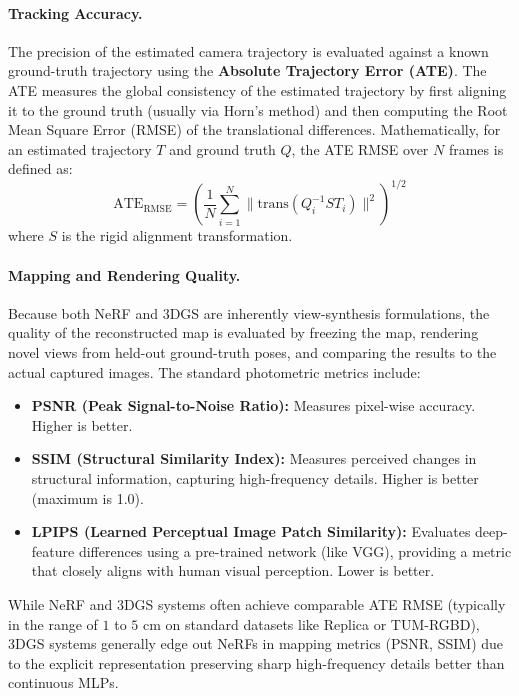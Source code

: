 \paragraph{Tracking Accuracy.} 
The precision of the estimated camera trajectory is evaluated against a known ground-truth trajectory using the \textbf{Absolute Trajectory Error (ATE)}. The ATE measures the global consistency of the estimated trajectory by first aligning it to the ground truth (usually via Horn's method) and then computing the Root Mean Square Error (RMSE) of the translational differences. Mathematically, for an estimated trajectory $T$ and ground truth $Q$, the ATE RMSE over $N$ frames is defined as:
\begin{equation}
    \text{ATE}_{\text{RMSE}} = \left( \frac{1}{N} \sum_{i=1}^{N} \bigl\| \text{trans}(Q_i^{-1} S T_i) \bigr\|^2 \right)^{1/2}
\end{equation}
where $S$ is the rigid alignment transformation.

\paragraph{Mapping and Rendering Quality.} 
Because both NeRF and 3DGS are inherently view-synthesis formulations, the quality of the reconstructed map is evaluated by freezing the map, rendering novel views from held-out ground-truth poses, and comparing the results to the actual captured images. The standard photometric metrics include:
\begin{itemize}
    \item \textbf{PSNR (Peak Signal-to-Noise Ratio):} Measures pixel-wise accuracy. Higher is better.
    \item \textbf{SSIM (Structural Similarity Index):} Measures perceived changes in structural information, capturing high-frequency details. Higher is better (maximum is 1.0).
    \item \textbf{LPIPS (Learned Perceptual Image Patch Similarity):} Evaluates deep-feature differences using a pre-trained network (like VGG), providing a metric that closely aligns with human visual perception. Lower is better.
\end{itemize}

While NeRF and 3DGS systems often achieve comparable ATE RMSE (typically in the range of $1$ to $5$ cm on standard datasets like Replica or TUM-RGBD), 3DGS systems generally edge out NeRFs in mapping metrics (PSNR, SSIM) due to the explicit representation preserving sharp high-frequency details better than continuous MLPs.